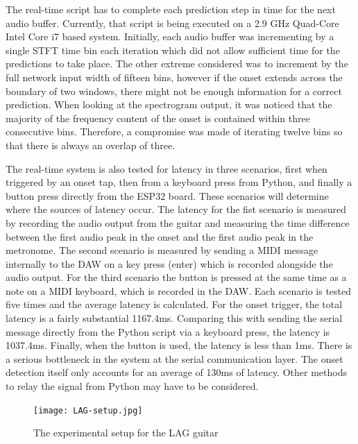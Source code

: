 \documentclass[conference]{IEEEtran}
\begin{document}
The real-time script has to complete each prediction step in time for the next audio buffer. Currently, that script is being executed on a 2.9 GHz Quad-Core Intel Core i7 based system. Initially, each audio buffer was incrementing
by a single STFT time bin each iteration which did not allow sufficient time for the predictions to take place. The other extreme considered was to increment by the full network input width of fifteen bins, however if the onset extends
across the boundary of two windows, there might not be enough information for a correct prediction. When looking at the spectrogram output, it was noticed that the majority of the frequency content of the onset is contained within three 
consecutive bins. Therefore, a compromise was made of iterating twelve bins so that there is always an overlap of three.

The real-time system is also tested for latency in three scenarios, first when triggered by an onset tap, then from a keyboard press from Python, and finally a button press directly from the
ESP32 board. These scenarios will determine where the sources of latency occur. The latency for the fist scenario is measured by recording the audio output from the guitar and measuring the time difference between the first audio peak in the onset and the first audio peak in the metronome.
The second scenario is measured by sending a MIDI message internally to the DAW on a key press (enter) which is recorded alongside the audio output. For the third scenario the button is pressed at the same time as a note on a MIDI keyboard, which is recorded in the DAW. 
Each scenario is tested five times and the average latency is calculated. For the onset trigger, the total latency is a fairly substantial 1167.4ms. Comparing this with sending
the serial message directly from the Python script via a keyboard press, the latency is 1037.4ms. Finally, when the button is used, the latency is less than 1ms.
There is a serious bottleneck in the system at the serial communication layer. The onset detection itself only accounts for an average of 130ms of latency. Other methods to relay the signal
from Python may have to be considered.

\begin{figure}[htbp]
    \centerline{\texttt{[image: LAG-setup.jpg]}}
    \caption{The experimental setup for the LAG guitar}
    \label{acoustic-bridge}
    \end{figure}
\end{document}
